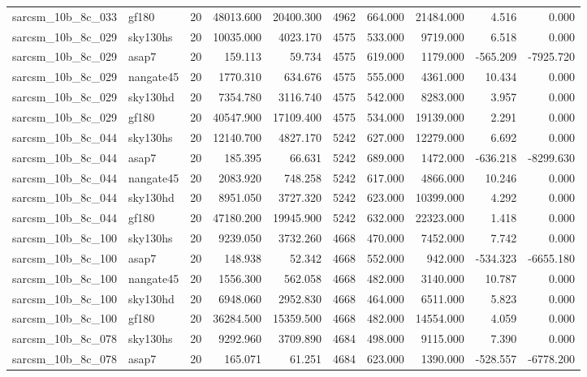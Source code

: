 \documentclass{article}
\begin{document}
\begin{longtable}{llrrrrrrrr}
sarcsm\_10b\_8c\_033 & gf180 & 20 & 48013.600 & 20400.300 & 4962 & 664.000 & 21484.000 & 4.516 & 0.000 \\
sarcsm\_10b\_8c\_029 & sky130hs & 20 & 10035.000 & 4023.170 & 4575 & 533.000 & 9719.000 & 6.518 & 0.000 \\
sarcsm\_10b\_8c\_029 & asap7 & 20 & 159.113 & 59.734 & 4575 & 619.000 & 1179.000 & -565.209 & -7925.720 \\
sarcsm\_10b\_8c\_029 & nangate45 & 20 & 1770.310 & 634.676 & 4575 & 555.000 & 4361.000 & 10.434 & 0.000 \\
sarcsm\_10b\_8c\_029 & sky130hd & 20 & 7354.780 & 3116.740 & 4575 & 542.000 & 8283.000 & 3.957 & 0.000 \\
sarcsm\_10b\_8c\_029 & gf180 & 20 & 40547.900 & 17109.400 & 4575 & 534.000 & 19139.000 & 2.291 & 0.000 \\
sarcsm\_10b\_8c\_044 & sky130hs & 20 & 12140.700 & 4827.170 & 5242 & 627.000 & 12279.000 & 6.692 & 0.000 \\
sarcsm\_10b\_8c\_044 & asap7 & 20 & 185.395 & 66.631 & 5242 & 689.000 & 1472.000 & -636.218 & -8299.630 \\
sarcsm\_10b\_8c\_044 & nangate45 & 20 & 2083.920 & 748.258 & 5242 & 617.000 & 4866.000 & 10.246 & 0.000 \\
sarcsm\_10b\_8c\_044 & sky130hd & 20 & 8951.050 & 3727.320 & 5242 & 623.000 & 10399.000 & 4.292 & 0.000 \\
sarcsm\_10b\_8c\_044 & gf180 & 20 & 47180.200 & 19945.900 & 5242 & 632.000 & 22323.000 & 1.418 & 0.000 \\
sarcsm\_10b\_8c\_100 & sky130hs & 20 & 9239.050 & 3732.260 & 4668 & 470.000 & 7452.000 & 7.742 & 0.000 \\
sarcsm\_10b\_8c\_100 & asap7 & 20 & 148.938 & 52.342 & 4668 & 552.000 & 942.000 & -534.323 & -6655.180 \\
sarcsm\_10b\_8c\_100 & nangate45 & 20 & 1556.300 & 562.058 & 4668 & 482.000 & 3140.000 & 10.787 & 0.000 \\
sarcsm\_10b\_8c\_100 & sky130hd & 20 & 6948.060 & 2952.830 & 4668 & 464.000 & 6511.000 & 5.823 & 0.000 \\
sarcsm\_10b\_8c\_100 & gf180 & 20 & 36284.500 & 15359.500 & 4668 & 482.000 & 14554.000 & 4.059 & 0.000 \\
sarcsm\_10b\_8c\_078 & sky130hs & 20 & 9292.960 & 3709.890 & 4684 & 498.000 & 9115.000 & 7.390 & 0.000 \\
sarcsm\_10b\_8c\_078 & asap7 & 20 & 165.071 & 61.251 & 4684 & 623.000 & 1390.000 & -528.557 & -6778.200 \\

\end{longtable}
\end{document}
